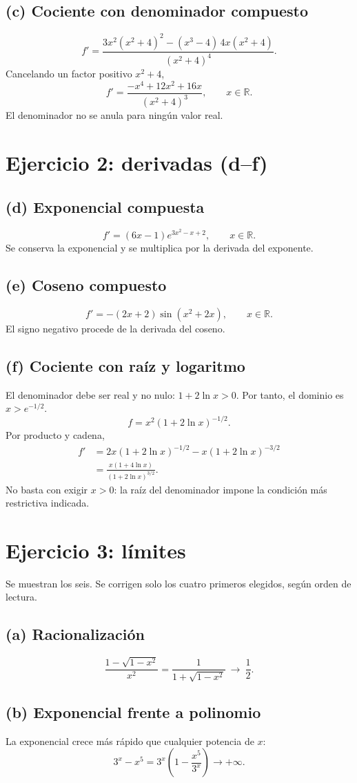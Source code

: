 \documentclass[11pt]{article}
\begin{document}
\subsection*{(c) Cociente con denominador compuesto}
\[f'=\frac{3x^2(x^2+4)^2-(x^3-4)\,4x(x^2+4)}{(x^2+4)^4}.\]
Cancelando un factor positivo $x^2+4$,
\[\boxed{f'=\frac{-x^4+12x^2+16x}{(x^2+4)^3}},\qquad x\in\mathbb R.\]
El denominador no se anula para ningún valor real.
\clearpage
\section*{Ejercicio 2: derivadas (d--f)}
\subsection*{(d) Exponencial compuesta}
\[\boxed{f'=(6x-1)e^{3x^2-x+2}},\qquad x\in\mathbb R.\]
Se conserva la exponencial y se multiplica por la derivada del exponente.
\subsection*{(e) Coseno compuesto}
\[\boxed{f'=-(2x+2)\sin(x^2+2x)},\qquad x\in\mathbb R.\]
El signo negativo procede de la derivada del coseno.
\subsection*{(f) Cociente con raíz y logaritmo}
El denominador debe ser real y no nulo: $1+2\ln x>0$. Por tanto, el dominio es $x>e^{-1/2}$.
\[f=x^2(1+2\ln x)^{-1/2}.\]
Por producto y cadena,
\begin{align*}
f'&=2x(1+2\ln x)^{-1/2}-x(1+2\ln x)^{-3/2}\\
&=\boxed{\frac{x(1+4\ln x)}{(1+2\ln x)^{3/2}}}.
\end{align*}
No basta con exigir $x>0$: la raíz del denominador impone la condición más restrictiva indicada.
\clearpage
\section*{Ejercicio 3: límites}
Se muestran los seis. Se corrigen solo los cuatro primeros elegidos, según orden de lectura.
\subsection*{(a) Racionalización}
\[\frac{1-\sqrt{1-x^2}}{x^2}=\frac1{1+\sqrt{1-x^2}}\ \longrightarrow\ \boxed{\frac12}.\]
\subsection*{(b) Exponencial frente a polinomio}
La exponencial crece más rápido que cualquier potencia de $x$:
\[3^x-x^5=3^x\left(1-\frac{x^5}{3^x}\right)\longrightarrow\boxed{+\infty}.\]
\end{document}
